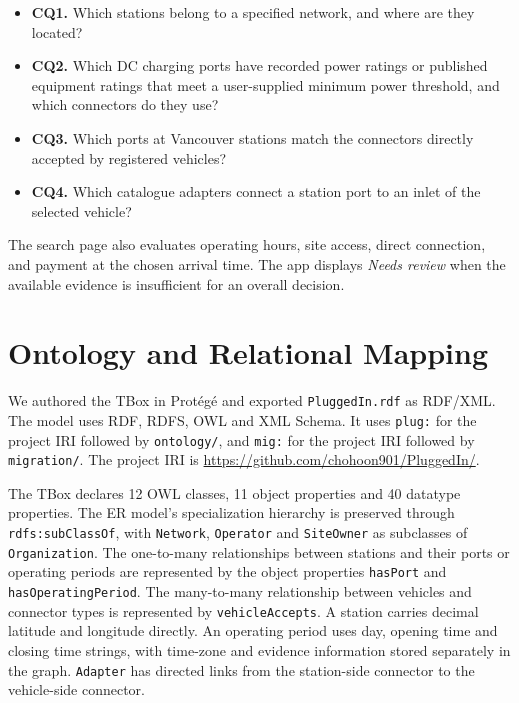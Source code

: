 \documentclass[sigconf,nonacm]{acmart}
\begin{document}
\begin{itemize}
  \item \textbf{CQ1.} Which stations belong to a specified network, and where are they located?
  \item \textbf{CQ2.} Which DC charging ports have recorded power ratings or published equipment ratings that meet a user-supplied minimum power threshold, and which connectors do they use?
  \item \textbf{CQ3.} Which ports at Vancouver stations match the connectors directly accepted by registered vehicles?
  \item \textbf{CQ4.} Which catalogue adapters connect a station port to an inlet of the selected vehicle?
\end{itemize}

The search page also evaluates operating hours, site access, direct connection, and payment at the chosen arrival time. The app displays \emph{Needs review} when the available evidence is insufficient for an overall decision.

\section{Ontology and Relational Mapping}

We authored the TBox in Prot\'eg\'e and exported \texttt{PluggedIn.rdf} as RDF/XML. The model uses RDF, RDFS, OWL and XML Schema. It uses \texttt{plug:} for the project IRI followed by \texttt{ontology/}, and \texttt{mig:} for the project IRI followed by \texttt{migration/}. The project IRI is \url{https://github.com/chohoon901/PluggedIn/}.

The TBox declares 12 OWL classes, 11 object properties and 40 datatype properties. The ER model's specialization hierarchy is preserved through \texttt{rdfs:subClassOf}, with \texttt{Network}, \texttt{Operator} and \texttt{SiteOwner} as subclasses of \texttt{Organization}. The one-to-many relationships between stations and their ports or operating periods are represented by the object properties \texttt{hasPort} and \texttt{hasOperatingPeriod}. The many-to-many relationship between vehicles and connector types is represented by \texttt{vehicleAccepts}. A station carries decimal latitude and longitude directly. An operating period uses day, opening time and closing time strings, with time-zone and evidence information stored separately in the graph. \texttt{Adapter} has directed links from the station-side connector to the vehicle-side connector.
\end{document}
